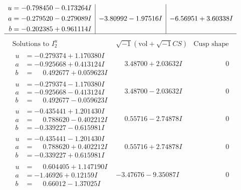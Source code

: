 \documentclass[1p]{elsarticle_modified}
\theoremstyle{definition}
\newcommand{\I}{\sqrt{-1}}
\begin{document}
$$\begin{array}{c|c|c}
\begin{aligned}
u &= -0.798450 - 0.173264 I \\
a &= -0.279520 - 0.279089 I \\
b &= -0.202385 + 0.961114 I\end{aligned}
 & -3.80992 - 1.97516 I & -6.56951 + 3.60338 I\\
 \hline 
 \end{array}$$\newpage$$\begin{array}{c|c|c}  
\text{Solutions to }I^u_{2}& \I (\text{vol} + \sqrt{-1}CS) & \text{Cusp shape}\\
 \hline 
\begin{aligned}
u &= -0.279374 + 1.170380 I \\
a &= -0.925668 + 0.413124 I \\
b &= \phantom{-}0.492677 + 0.059623 I\end{aligned}
 & \phantom{-}3.48700 + 2.03632 I & \phantom{-0.000000 } 0 \\ \hline\begin{aligned}
u &= -0.279374 - 1.170380 I \\
a &= -0.925668 - 0.413124 I \\
b &= \phantom{-}0.492677 - 0.059623 I\end{aligned}
 & \phantom{-}3.48700 - 2.03632 I & \phantom{-0.000000 } 0 \\ \hline\begin{aligned}
u &= -0.435441 + 1.201430 I \\
a &= \phantom{-}0.788620 - 0.402212 I \\
b &= -0.339227 - 0.615981 I\end{aligned}
 & \phantom{-}0.55716 - 2.74878 I & \phantom{-0.000000 } 0 \\ \hline\begin{aligned}
u &= -0.435441 - 1.201430 I \\
a &= \phantom{-}0.788620 + 0.402212 I \\
b &= -0.339227 + 0.615981 I\end{aligned}
 & \phantom{-}0.55716 + 2.74878 I & \phantom{-0.000000 } 0 \\ \hline\begin{aligned}
u &= \phantom{-}0.604405 + 1.147190 I \\
a &= -1.46926 + 0.12159 I \\
b &= \phantom{-}0.66012 - 1.37025 I\end{aligned}
 & -3.47676 - 9.35087 I & \phantom{-0.000000 } 0 \\ \hline\begin{aligned}

\end{aligned}
\end{array}$$
\end{document}
